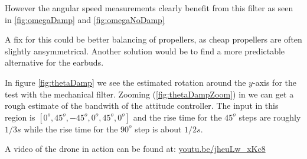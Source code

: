 
However the angular speed measurements clearly benefit from this filter as seen
in \ref{fig:omegaDamp} and \ref{fig:omegaNoDamp}


A fix for this could be better balancing of propellers, as cheap propellers are
often slightly ansymmetrical. Another solution would be to find a more
predictable alternative for the earbuds.

In figure \ref{fig:thetaDamp} we see the estimated rotation around the
$y$-axis for the test with the mechanical filter. Zooming
(\ref{fig:thetaDampZoom}) in we can get a rough estimate of the bandwith of the
attitude controller. The input in this region is $[0^o, 45^o, -45^o, 0^o, 45^o,
0^o]$ and the rise time for the $45^o$ steps are roughly $1/3 s$ while the rise
time for the $90^o$ step is about $1/2 s$.



A video of the drone in action can be found at: \url{youtu.be/jheuLw_xKc8}




%
%






